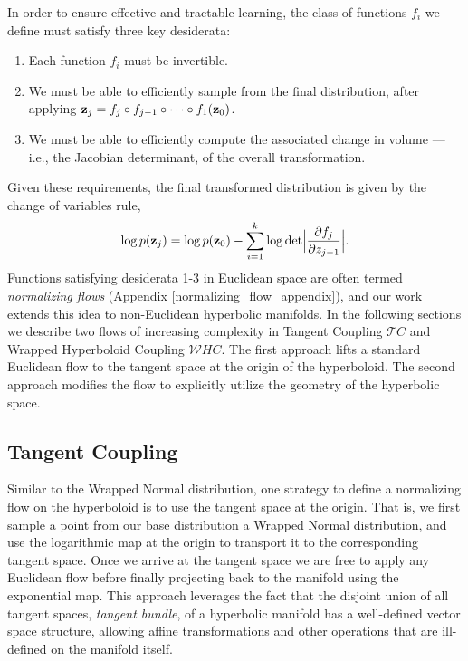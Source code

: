 In order to ensure effective and tractable learning, the class of functions $f_i$ we define must satisfy three key desiderata:
\begin{enumerate}[itemsep=0pt, parsep=0pt, topsep=0pt]
    \item Each function $f_i$ must be invertible. 
    \item We must be able to efficiently sample from the final distribution, after applying $\mathbf{z}_j = f_j \circ f_{j-1} \circ \dots \circ f_1(\mathbf{z}_0)$. 
    \item We must be able to efficiently compute the associated change in volume ---i.e., the Jacobian determinant, of the overall transformation.
\end{enumerate}
 Given these requirements, the final transformed distribution is given by the change of variables rule,
\begin{equation}
    \log p(\mathbf{z}_j) = \log p(\mathbf{z}_0) - \sum_{i=1}^k\log \textnormal{det}\Big|\frac{\partial f_j}{\partial z_{j-1}} \Big|.
\end{equation}
Functions satisfying desiderata 1-3 in Euclidean space are often termed {\em normalizing flows} (Appendix \ref{normalizing_flow_appendix}), and our work extends this idea to non-Euclidean hyperbolic manifolds. In the following sections we describe two flows of increasing complexity in Tangent Coupling $\mathcal{T}C$ and Wrapped Hyperboloid Coupling $\mathcal{W}HC$. The first approach lifts a standard Euclidean flow to the tangent space at the origin of the hyperboloid.
The second approach modifies the flow to explicitly utilize the geometry of the hyperbolic space.

\subsection{Tangent Coupling}
Similar to the Wrapped Normal distribution, one strategy to define a normalizing flow on the hyperboloid is to use the tangent space at the origin. 
That is, we first sample a point from our base distribution a Wrapped Normal distribution, and use the logarithmic map at the origin to transport it to the corresponding tangent space. Once we arrive at the tangent space we are free to apply any Euclidean flow before finally projecting back to the manifold using the exponential map. 
This approach leverages the fact that the disjoint union of all tangent spaces, \textit{tangent bundle}, of a hyperbolic manifold has a well-defined vector space structure, allowing affine transformations and other operations that are ill-defined on the manifold itself. 

